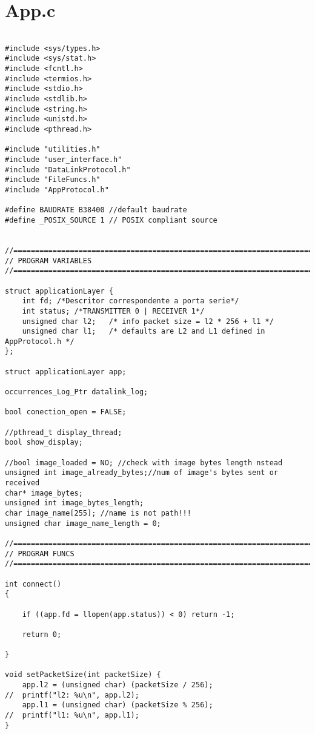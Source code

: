 \section{App.c}
\label{APPC}

\begin{lstlisting}

#include <sys/types.h>
#include <sys/stat.h>
#include <fcntl.h>
#include <termios.h>
#include <stdio.h>
#include <stdlib.h>
#include <string.h>
#include <unistd.h>
#include <pthread.h>

#include "utilities.h"
#include "user_interface.h"
#include "DataLinkProtocol.h"
#include "FileFuncs.h"
#include "AppProtocol.h"

#define BAUDRATE B38400 //default baudrate
#define _POSIX_SOURCE 1 // POSIX compliant source 


//=======================================================================
// PROGRAM VARIABLES
//=======================================================================

struct applicationLayer {
	int fd; /*Descritor correspondente a porta serie*/
	int status; /*TRANSMITTER 0 | RECEIVER 1*/
	unsigned char l2;	/* info packet size = l2 * 256 + l1 */
	unsigned char l1;	/* defaults are L2 and L1 defined in AppProtocol.h */	
};

struct applicationLayer app;

occurrences_Log_Ptr datalink_log;

bool conection_open = FALSE;

//pthread_t display_thread;
bool show_display;

//bool image_loaded = NO; //check with image bytes length nstead
unsigned int image_already_bytes;//num of image's bytes sent or received
char* image_bytes;
unsigned int image_bytes_length;
char image_name[255]; //name is not path!!!
unsigned char image_name_length = 0;

//=======================================================================
// PROGRAM FUNCS
//=======================================================================

int connect()
{

	if ((app.fd = llopen(app.status)) < 0) return -1;

	return 0;

}

void setPacketSize(int packetSize) {
	app.l2 = (unsigned char) (packetSize / 256);
//	printf("l2: %u\n", app.l2);
	app.l1 = (unsigned char) (packetSize % 256);
//	printf("l1: %u\n", app.l1);
}


\end{lstlisting}
